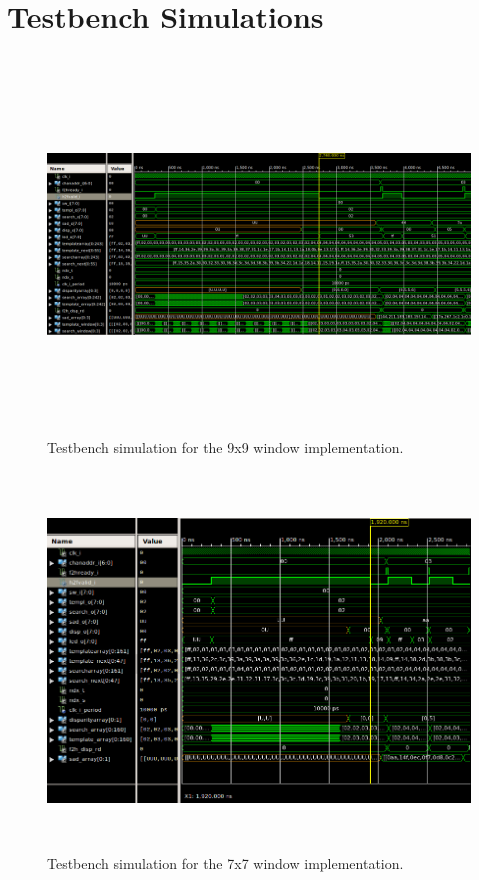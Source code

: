 \chapter{Testbench Simulations}
\label{sec:appdxD}

\begin{figure}
	\begin{center}
		\includegraphics[height=100mm]{figures/testbench_simulation_9x9.png}
		\captionfonts
		\caption{Testbench simulation for the 9x9 window implementation.}
		\label{fig:tb_9x9}
	\end{center}
\end{figure}


\begin{figure}
	\begin{center}
		\includegraphics[height=100mm]{figures/testbench_simulation_7x7.png}
		\captionfonts
		\caption{Testbench simulation for the 7x7 window implementation.}
		\label{fig:tb_7x7}
	\end{center}
\end{figure}
